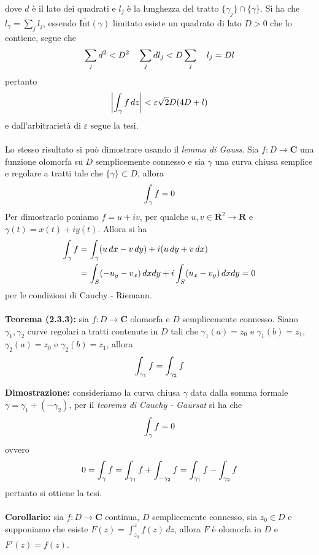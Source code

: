 \documentclass{article}
\begin{document}
dove $d$ è il lato dei quadrati e $l_j$ è la lunghezza del tratto $\{\gamma_j\} \cap \{\gamma\}$. Si ha che $l_\gamma = \sum_j l_j$, essendo $\overline{\mathrm{Int}}(\gamma)$ limitato esiste un quadrato di lato $D > 0$ che lo contiene, segue che
\begin{gather}
    \sum_j d^2 < D^2 \quad \sum_j dl_j < D\sum_j \quad l_j = Dl \notag
\end{gather}
pertanto
\begin{gather}
    \left|\int_\gamma f \, dz\right| < \varepsilon\sqrt{2}D(4D + l) \notag
\end{gather}
e dall'arbitrarietà di $\varepsilon$ segue la tesi. \\ \\
Lo stesso risultato si può dimostrare usando il \textit{lemma di Gauss}. Sia $f : D \longrightarrow \mathbf{C}$ una funzione olomorfa su $D$ semplicemente connesso e sia $\gamma$ una curva chiusa semplice e regolare a tratti tale che $\{\gamma\} \subset D$, allora
\begin{gather}
    \int_\gamma f = 0 \notag
\end{gather}
Per dimostrarlo poniamo $f = u + iv$, per qualche $u, v \in \mathbf{R}^2 \longrightarrow \mathbf{R}$ e $\gamma(t) = x(t) + iy(t)$. Allora si ha
\begin{align}
    \int_\gamma f &= \int_\gamma (u \, dx - v \, dy) + i(u \, dy + v \, dx) \notag \\
    &= \int_S (-u_y - v_x) \, dxdy + i\int_S (u_x - v_y) \, dxdy = 0 \notag
\end{align}
per le condizioni di Cauchy - Riemann. \\ \\
\textbf{Teorema (2.3.3):} sia $f : D \longrightarrow \mathbf{C}$ olomorfa e $D$ semplicemente connesso. Siano $\gamma_1, \gamma_2$ curve regolari a tratti contenute in $D$ tali che $\gamma_1(a) = z_0$ e $\gamma_1(b) = z_1$, $\gamma_2(a) = z_0$ e $\gamma_2(b) = z_1$, allora
\begin{gather}
    \int_{\gamma_1}f = \int_{\gamma_2}f \notag
\end{gather}

\textbf{Dimostrazione:} consideriamo la curva chiusa $\gamma$ data dalla somma formale $\gamma = \gamma_1 + (-\gamma_2)$, per il \textit{teorema di Cauchy - Gaursat} si ha che
\begin{gather}
    \int_\gamma f = 0 \notag
\end{gather}
ovvero
\begin{gather}
     0 = \int_\gamma f = \int_{\gamma_1}f + \int_{-\gamma_2}f = \int_{\gamma_1}f - \int_{\gamma_2}f \notag
\end{gather}
pertanto si ottiene la tesi. \\ \\
\textbf{Corollario:} sia $f : D \longrightarrow \mathbf{C}$ continua, $D$ semplicemente connesso, sia $z_0 \in D$ e supponiamo che esiste $F(z) = \int_{z_0}^z f(z) \, dz$, allora $F$ è olomorfa in $D$ e $F'(z) = f(z)$. \\
\end{document}
